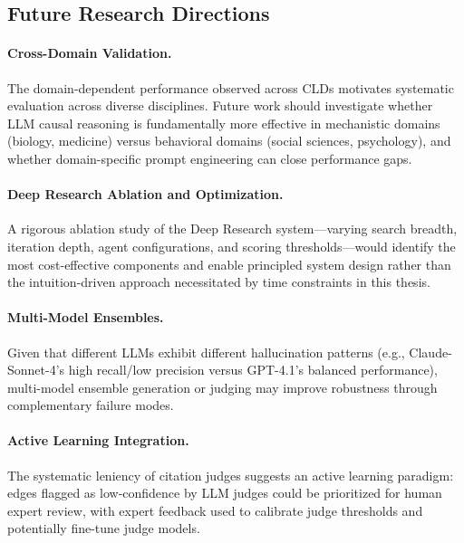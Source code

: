 \subsection{Future Research Directions}
\label{sec:conclusion_future}

\paragraph{Cross-Domain Validation.}
The domain-dependent performance observed across CLDs motivates systematic evaluation across diverse disciplines. Future work should investigate whether LLM causal reasoning is fundamentally more effective in mechanistic domains (biology, medicine) versus behavioral domains (social sciences, psychology), and whether domain-specific prompt engineering can close performance gaps.

\paragraph{Deep Research Ablation and Optimization.}
A rigorous ablation study of the Deep Research system---varying search breadth, iteration depth, agent configurations, and scoring thresholds---would identify the most cost-effective components and enable principled system design rather than the intuition-driven approach necessitated by time constraints in this thesis.

\paragraph{Multi-Model Ensembles.}
Given that different LLMs exhibit different hallucination patterns (e.g., Claude-Sonnet-4's high recall/low precision versus GPT-4.1's balanced performance), multi-model ensemble generation or judging may improve robustness through complementary failure modes.

\paragraph{Active Learning Integration.}
The systematic leniency of citation judges suggests an active learning paradigm: edges flagged as low-confidence by LLM judges could be prioritized for human expert review, with expert feedback used to calibrate judge thresholds and potentially fine-tune judge models.

